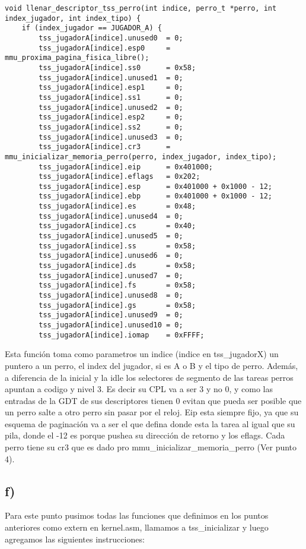 \begin{codesnippet}
\begin{verbatim}
void llenar_descriptor_tss_perro(int indice, perro_t *perro, int index_jugador, int index_tipo) {
    if (index_jugador == JUGADOR_A) {
        tss_jugadorA[indice].unused0  = 0;
        tss_jugadorA[indice].esp0     = mmu_proxima_pagina_fisica_libre();
        tss_jugadorA[indice].ss0      = 0x58;
        tss_jugadorA[indice].unused1  = 0;
        tss_jugadorA[indice].esp1     = 0;
        tss_jugadorA[indice].ss1      = 0;
        tss_jugadorA[indice].unused2  = 0;
        tss_jugadorA[indice].esp2     = 0;
        tss_jugadorA[indice].ss2      = 0;
        tss_jugadorA[indice].unused3  = 0;
        tss_jugadorA[indice].cr3      = mmu_inicializar_memoria_perro(perro, index_jugador, index_tipo);
        tss_jugadorA[indice].eip      = 0x401000;
        tss_jugadorA[indice].eflags   = 0x202;
        tss_jugadorA[indice].esp      = 0x401000 + 0x1000 - 12;
        tss_jugadorA[indice].ebp      = 0x401000 + 0x1000 - 12;
        tss_jugadorA[indice].es       = 0x48;
        tss_jugadorA[indice].unused4  = 0;
        tss_jugadorA[indice].cs       = 0x40;
        tss_jugadorA[indice].unused5  = 0;
        tss_jugadorA[indice].ss       = 0x58;
        tss_jugadorA[indice].unused6  = 0;
        tss_jugadorA[indice].ds       = 0x58;
        tss_jugadorA[indice].unused7  = 0;
        tss_jugadorA[indice].fs       = 0x58;
        tss_jugadorA[indice].unused8  = 0;
        tss_jugadorA[indice].gs       = 0x58;
        tss_jugadorA[indice].unused9  = 0;
        tss_jugadorA[indice].unused10 = 0;
        tss_jugadorA[indice].iomap    = 0xFFFF;
 \end{verbatim}
 \end{codesnippet}
Esta función toma como parametros un indice (indice en tss\_jugadorX) un puntero a un perro, el index del jugador, si es A o B y el tipo de perro. Además, a diferencia de la inicial y la idle los selectores de segmento de las tareas perros apuntan a codigo y nivel 3. Es decir su CPL va a ser 3 y no 0, y como las entradas de la GDT de sus descriptores tienen 0  evitan que pueda ser posible que un perro salte a otro perro sin pasar por el reloj. Eip esta siempre fijo, ya que su esquema de paginación va a ser el que defina donde esta la tarea al igual que su pila, donde el -12 es porque pushea su dirección de retorno y los eflags. Cada perro tiene su cr3 que es dado pro  mmu\_inicializar\_memoria\_perro (Ver punto 4). 

\subsection*{f)}
Para este punto pusimos todas las funciones que definimos en los puntos anteriores como extern en kernel.asm, llamamos a tss\_inicializar y luego agregamos las siguientes instrucciones:

